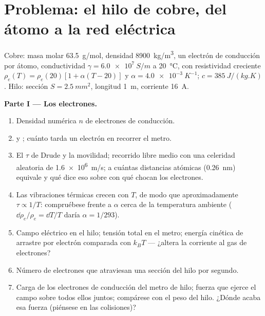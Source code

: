 \section{Problema: el hilo de cobre, del átomo a la red eléctrica}

\begin{problem}
\label{pb:b2:charges-currents-conduction:1}

Cobre: masa molar \qty{63.5}{g/mol}, densidad \qty{8900}{kg/m^3}, un
electrón de conducción por átomo, conductividad $\gamma = \qty{6.0e7}{S/m}$ a
\qty{20}{\degreeCelsius}, con resistividad creciente $\rho_e(T) = \rho_e(20)[1 +
\alpha(T - 20)]$ y $\alpha = \qty{4.0e-3}{K^{-1}}$; $c = \qty{385}{J/(kg.K)}$. Hilo:
sección $S = \qty{2.5}{mm^2}$, longitud \qty{1}{m}, corriente \qty{16}{A}.

\medskip
\noindent\textbf{Parte I --- Los electrones.}
\begin{enumerate}
  \item Densidad numérica $n$ de electrones de conducción.
  \item {} y ; cuánto tarda un
        electrón en recorrer el metro.
  \item El $\tau$ de Drude y la movilidad; recorrido libre medio con una
        celeridad aleatoria de \qty{1.6e6}{m/s}; a cuántas distancias
        atómicas (\qty{0.26}{nm}) equivale y qué dice eso sobre con qué
        chocan los electrones.
  \item Las vibraciones térmicas crecen con $T$, de modo que
        aproximadamente $\tau \propto 1/T$: compruébese frente a $\alpha$
        cerca de la temperatura ambiente ($\dd\rho_e/\rho_e =
        \dd T/T$ daría $\alpha = 1/293$).
  \item Campo eléctrico en el hilo; tensión total en el metro; energía
        cinética de arrastre por electrón comparada con $k_BT$ --- ¿altera
        la corriente al gas de electrones?
  \item Número de electrones que atraviesan una sección del hilo por
        segundo.
  \item Carga de los electrones de conducción del metro de hilo; fuerza
        que ejerce el campo sobre todos ellos juntos; compárese con el
        peso del hilo. ¿Dónde acaba esa fuerza (piénsese en las
        colisiones)?
\end{enumerate}


\end{problem}
